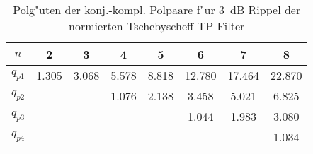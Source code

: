 \begin{table}[!htb]
\begin{center}
{\footnotesize
\begin{tabular}{|c||c|c|c|c|c|c|c|}\hline
$n$ & 2 & 3 & 4 & 5 & 6 & 7 & 8 \\ \hline\hline
$q_{p1}$ & 1.305 & 3.068 & 5.578 & 8.818 & 12.780 & 17.464 & 22.870 \\ \hline
$q_{p2}$ &       &       & 1.076 & 2.138 & 3.458 & 5.021 & 6.825 \\ \hline
$q_{p3}$ &       &       &       &       & 1.044 & 1.983 & 3.080 \\ \hline
$q_{p4}$ &       &       &       &       &       &       & 1.034 \\ \hline
\end{tabular}
}
\end{center}\vspace*{-4mm}\caption{Polg"uten der konj.-kompl. Polpaare f"ur 3~dB Rippel der normierten Tschebyscheff-TP-Filter} \label{gp-3}
\end{table}



